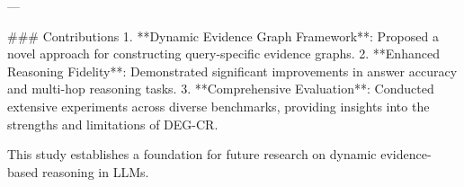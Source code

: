 ---

### Contributions
1. **Dynamic Evidence Graph Framework**: Proposed a novel approach for constructing query-specific evidence graphs.
2. **Enhanced Reasoning Fidelity**: Demonstrated significant improvements in answer accuracy and multi-hop reasoning tasks.
3. **Comprehensive Evaluation**: Conducted extensive experiments across diverse benchmarks, providing insights into the strengths and limitations of DEG-CR.

This study establishes a foundation for future research on dynamic evidence-based reasoning in LLMs.